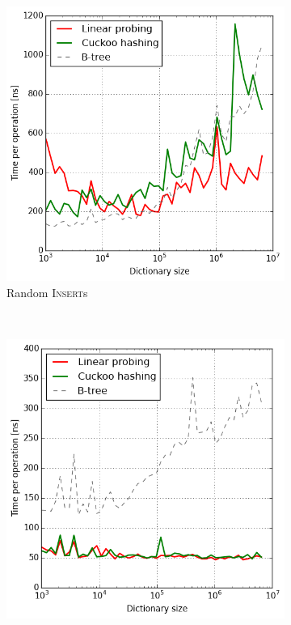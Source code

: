 \begin{figure}
\begin{subfigure}[t]{0.31\textwidth}
	\includegraphics[width=\textwidth]{img/performance/hashing-2}
	\caption{Random \textsc{Insert}s}
\end{subfigure}
~
\begin{subfigure}[t]{0.31\textwidth}
	\includegraphics[width=\textwidth]{img/performance/hashing-3}

\end{subfigure}
\end{figure}

